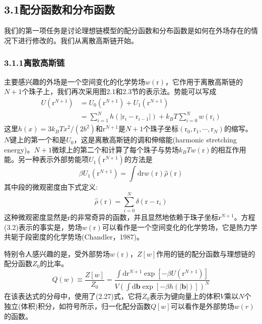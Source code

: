 \subsection{3.1配分函数和分布函数}
我们的第一项任务是讨论理想链模型的配分函数和分布函数是如何在外场存在的情况下进行修改的。我们从离散高斯链开始。
\subsubsection{3.1.1离散高斯链}
主要感兴趣的外场是一个空间变化的化学势场$w(\mathrm{r})$，它作用于离散高斯链的$N+1$个珠子上，我们再次采用图2.1和2.3节的表示法。势能可以写成
\begin{equation}
\begin{aligned}
U(\mathrm{r}^{N+1})&=U_0(\mathrm{r}^{N+1})+U_1(\mathrm{r}^{N+1})\\
&=\sum\limits_{i=1}^Nh(\left|\mathrm{r}_i-\mathrm{r}_{i-1}\right|)+k_BT\sum\limits_{i=0}^Nw(\mathrm{r}_i)
\end{aligned}
\end{equation}
这里$h(x)=3k_BTx^2/(2b^2)$和$\mathrm{r}^{N+1}$是$N+1$个珠子坐标$(\mathrm{r}_0,\mathrm{r}_1,\cdots,\mathrm{r}_N)$的缩写。$N$键上的第一个和是$U_0$，这是离散高斯链的调和伸缩能(harmonic stretching energy)。$N+1$微球上的第二个和计算了每个珠子与势场$k_BTw(\mathrm{r})$的相互作用能。另一种表示外部势能项$U_1(\mathrm{r}^{N+1})$的方法是
\begin{equation}
\beta U_1(\mathrm{r}^{N+1})=\int\mathrm{d}\mathrm{r}w(\mathrm{r})\hat{\rho}(\mathrm{r})
\end{equation}
其中段的微观密度由下式定义:
\begin{equation}
\hat{\rho}(\mathrm{r})=\sum\limits_{i=0}^N\delta(\mathrm{r}-\mathrm{r}_i)
\end{equation}
这种微观密度显然是$\mathrm{r}$的非常奇异的函数，并且显然地依赖于珠子坐标$\mathrm{r}^{N+1}$。方程(3.2)表示的事实是，势场$w(\mathrm{r})$可以看作是一个空间变化的化学势场，它是热力学共轭于段密度的化学势场(Chandler，1987)。

特别令人感兴趣的是，受外部势场$w(\mathrm{r})$，$Z[w]$作用的链的配分函数与理想链的配分函数$Z_0$的比率。
\begin{equation}
Q(w)\equiv\frac{Z[w]}{Z_0}=\frac{\int\mathrm{d}\mathrm{r}^{N+1}\exp[-\beta U(\mathrm{r}^{N+1})]}{V(\int\mathrm{d}\mathbf{b}\exp[-\beta h(\left|\mathbf{b}\right|)])^N}
\end{equation}
在该表达式的分母中，使用了(2.27)式，它将$Z_0$表示为键向量上的体积$V$乘以$N$个独立(体积)积分，如符号所示，归一化配分函数$Q[w]$可以看作是外部势场$w(r)$的函数。

